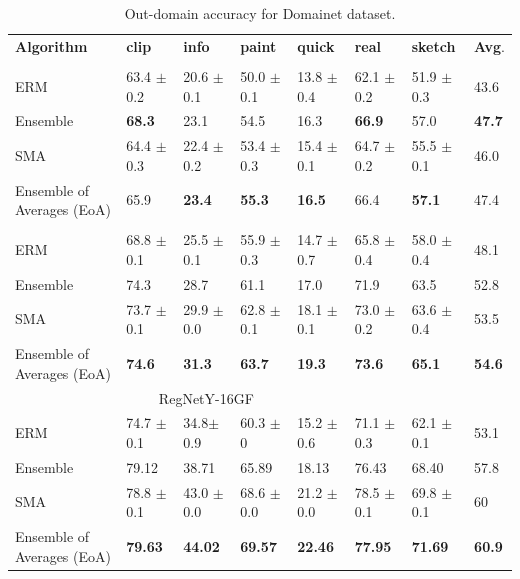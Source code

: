\begin{table}[]
\small
\centering
\caption{Out-domain accuracy for Domainet dataset.}
\begin{tabular}{lllllll|l}
\hline
\textbf{Algorithm}          & \textbf{clip}           & \textbf{info}           & \textbf{paint}     & \textbf{quick}  & \textbf{real}  & \textbf{sketch}    & \textbf{Avg}. \\ \hhline{=======|=}
\multicolumn{7}{c}{{ResNet-50}}\\
\hline
ERM & 63.4 $\pm$ 0.2          & 20.6 $\pm$ 0.1           & 50.0 $\pm$ 0.1         & 13.8 $\pm$ 0.4      &   62.1 $\pm$ 0.2  & 51.9 $\pm$ 0.3 & 43.6\\
Ensemble & \textbf{68.3}             &  23.1           &     54.5  &  16.3  & \textbf{66.9} & 57.0 &   \textbf{47.7}  \\
\hline
\rowcolor{Gray}
SMA & 64.4 $\pm$ 0.3           & 22.4 $\pm$ 0.2          & 53.4 $\pm$ 0.3          & 15.4 $\pm$ 0.1     &  64.7 $\pm$ 0.2  &  55.5 $\pm$ 0.1  & 46.0 \\
 \rowcolor{Gray}
Ensemble of Averages (EoA) & 65.9        & \textbf{23.4}     & \textbf{55.3}  & \textbf{16.5}  & 66.4  &  \textbf{57.1}      & 47.4 \\ 
\hhline{=======|=}
\multicolumn{7}{c}{{ResNeXt-50 32x4d  \cite{yalniz2019billion}}}\\
\hline
ERM & 68.8 $\pm$ 0.1          & 25.5 $\pm$ 0.1     & 55.9 $\pm$ 0.3         & 14.7 $\pm$ 0.7   & 65.8 $\pm$ 0.4 &  58.0 $\pm$ 0.4 &  48.1 \\
Ensemble & 74.3       & 28.7   &  61.1 & 17.0   & 71.9    &     63.5   & 52.8 \\
\hline
\rowcolor{Gray}
SMA & 73.7 $\pm$ 0.1      & 29.9 $\pm$ 0.0     & 62.8 $\pm$ 0.1    & 18.1 $\pm$ 0.1  & 73.0 $\pm$ 0.2 & 63.6 $\pm$ 0.4  & 53.5 \\
 \rowcolor{Gray}
Ensemble of Averages (EoA) & \textbf{74.6}    & \textbf{31.3}  & \textbf{63.7}  & \textbf{19.3}  &   \textbf{73.6}  & \textbf{65.1 }& \textbf{54.6} \\
\hline
\multicolumn{6}{c}{{RegNetY-16GF \cite{singh2022revisiting}}}\\
\hline
ERM & 74.7 $\pm$    0.1    & 34.8$\pm$ 0.9   & 60.3 $\pm$  0      &  15.2 $\pm$ 0.6   & 71.1 $\pm$ 0.3 & 62.1  $\pm$ 0.1 & 53.1  \\
Ensemble &   79.12     &  38.71  & 65.89  &  18.13 & 76.43    &   68.40     & 57.8 \\
\hline
\rowcolor{Gray}
SMA & 78.8 $\pm$ 0.1    &  43.0 $\pm$ 0.0     & 68.6 $\pm$    0.0 & 21.2 $\pm$ 0.0  & 78.5 $\pm$ 0.1 & 69.8  $\pm$ 0.1 & 60 \\
 \rowcolor{Gray}
Ensemble of Averages (EoA) & \textbf{79.63}    & \textbf{44.02}  & \textbf{69.57}  & \textbf{22.46}  &   \textbf{77.95}  & \textbf{71.69}& \textbf{60.9} \\
\hline
\end{tabular}
\label{tab:domainnet_perf}
\end{table}




